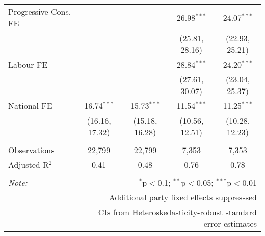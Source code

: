\begin{table}[!htb]
\begin{tabular}{@{\extracolsep{5pt}}lcccc}
  Progressive Cons. FE &  &  & 26.98$^{***}$ & 24.07$^{***}$ \\ 
  &  &  & (25.81, 28.16) & (22.93, 25.21) \\ 
  Labour FE &  &  & 28.84$^{***}$ & 24.20$^{***}$ \\ 
  &  &  & (27.61, 30.07) & (23.04, 25.37) \\ 
  National FE & 16.74$^{***}$ & 15.73$^{***}$ & 11.54$^{***}$ & 11.25$^{***}$ \\ 
  & (16.16, 17.32) & (15.18, 16.28) & (10.56, 12.51) & (10.28, 12.23) \\ 
 \hline \\[-1.8ex] 
Observations & 22,799 & 22,799 & 7,353 & 7,353 \\ 
Adjusted R$^{2}$ & 0.41 & 0.48 & 0.76 & 0.78 \\ 
\hline 
\hline \\[-1.8ex] 
\textit{Note:}  & \multicolumn{4}{r}{$^{*}$p$<$0.1; $^{**}$p$<$0.05; $^{***}$p$<$0.01} \\ 
 & \multicolumn{4}{r}{Additional party fixed effects suppresssed} \\ 
 & \multicolumn{4}{r}{CIs from Heteroskedasticity-robust standard error estimates} \\ 
\end{tabular} 
\end{table} 

